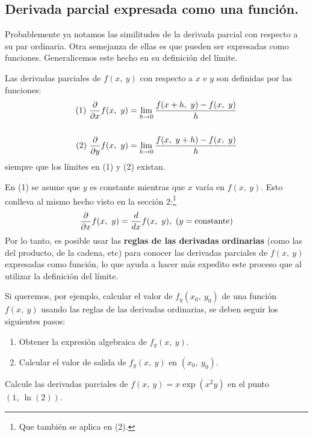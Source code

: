 \documentclass[12pt]{article}
\begin{document}
\subsection{Derivada parcial expresada como una función.}

Probablemente ya notamos las similitudes de la derivada parcial con respecto a su par ordinaria. Otra semejanza de ellas es que pueden ser expresadas como funciones. Generalicemos este hecho en su definición del límite.

Las derivadas parciales de $f(x, \ y)$ con respecto a $x$ e $y$ son definidas por las funciones:
\begin{align*}
(1) \ \frac{\partial }{\partial x} f(x, \ y) = \lim_{h \to 0} \frac{f(x + h, \ y) - f(x, \ y)}{h} \\ \\
(2) \ \frac{\partial }{\partial y} f(x, \ y) = \lim_{h \to 0} \frac{f(x, \ y + h) - f(x, \ y)}{h}
\end{align*}
siempre que los límites en (1) y (2) existan.

En (1) se asume que $y$ es constante mientras que $x$ varía en $f(x, \ y)$. Esto conlleva al mismo hecho visto en la sección 2:\footnote{Que también se aplica en (2).}
\[
  \derivpar{x} f(x, \ y) = \deriv{x} f(x, \ y), \ (y = \text{constante})
\]
Por lo tanto, es posible usar las \textbf{reglas de las derivadas ordinarias} (como las del producto, de la cadena, etc) para conocer las derivadas parciales de $f(x, \ y)$ expresadas como función, lo que ayuda a hacer más expedito este proceso que al utilizar la definición del límite.

Si queremos, por ejemplo, calcular el valor de $f_{y}(x_{0}, \ y_{0})$ de una función $f(x, \ y)$ usando las reglas de las derivadas ordinarias, se deben seguir los siguientes pasos:

\begin{enumerate}
\item Obtener la expresión algebraica de $f_{y}(x, \ y)$.
\item Calcular el valor de salida de $f_{y}(x, \ y)$ en $(x_{0}, \ y_{0})$.
\end{enumerate}

\ejemplo Calcule las derivadas parciales de $f(x, \ y) = x \exp(x^{2}y)$ en el punto $(1, \ \ln(2))$.
\end{document}
